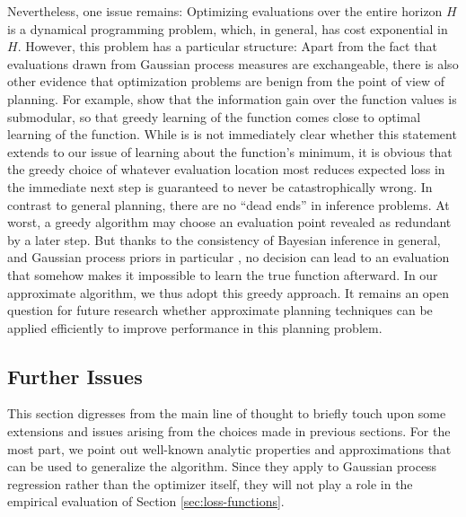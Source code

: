 \documentclass[twoside,11pt]{article}
\begin{document}
Nevertheless, one issue remains: Optimizing evaluations over the
entire horizon $H$ is a dynamical programming problem, which, in
general, has cost exponential in $H$. However, this problem has a
particular structure: Apart from the fact that evaluations drawn from
Gaussian process measures are exchangeable, there is also other
evidence that optimization problems are benign from the point of view
of planning. For example, \citet{srinivasgaussian} show that the
information gain over the function values is submodular, so that
greedy learning of the function comes close to optimal learning of the
function. While is is not immediately clear whether this statement
extends to our issue of learning about the function's minimum, it is
obvious that the greedy choice of whatever evaluation location most
reduces expected loss in the immediate next step is guaranteed to
never be catastrophically wrong. In contrast to general planning,
there are no ``dead ends'' in inference problems. At worst, a greedy
algorithm may choose an evaluation point revealed as redundant by a
later step. But thanks to the consistency of Bayesian inference in
general, and Gaussian process priors in particular
\citep{van2011information}, no decision can lead to an evaluation that
somehow makes it impossible to learn the true function afterward. In
our approximate algorithm, we thus adopt this greedy approach. It
remains an open question for future research whether approximate
planning techniques can be applied efficiently to improve performance
in this planning problem.

\subsection{Further Issues}
\label{sec:further-issues}
This section digresses from the main line of thought to briefly touch
upon some extensions and issues arising from the choices made in
previous sections. For the most part, we point out well-known analytic
properties and approximations that can be used to generalize the
algorithm. Since they apply to Gaussian process regression rather than
the optimizer itself, they will not play a role in the empirical
evaluation of Section \ref{sec:loss-functions}.
\end{document}
